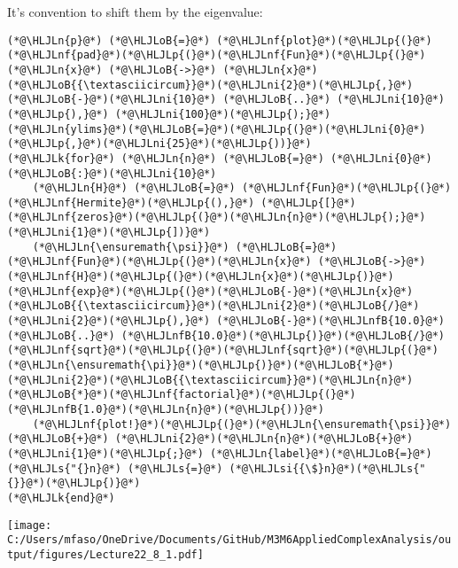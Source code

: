 \documentclass[12pt,landscape]{article}
\newcommand{\HLJLk}[1]{\textcolor[RGB]{148,91,176}{\textbf{#1}}}
\newcommand{\HLJLn}[1]{#1}
\newcommand{\HLJLnf}[1]{\textcolor[RGB]{66,102,213}{#1}}
\newcommand{\HLJLs}[1]{\textcolor[RGB]{201,61,57}{#1}}
\newcommand{\HLJLsi}[1]{#1}
\newcommand{\HLJLnfB}[1]{\textcolor[RGB]{59,151,46}{#1}}
\newcommand{\HLJLni}[1]{\textcolor[RGB]{59,151,46}{#1}}
\newcommand{\HLJLoB}[1]{\textcolor[RGB]{102,102,102}{\textbf{#1}}}
\newcommand{\HLJLp}[1]{#1}
\def\cent#1{\begin{center}#1\end{center} }
\begin{document}
{It's convention to shift them by the eigenvalue:


\begin{lstlisting}
(*@\HLJLn{p}@*) (*@\HLJLoB{=}@*) (*@\HLJLnf{plot}@*)(*@\HLJLp{(}@*)(*@\HLJLnf{pad}@*)(*@\HLJLp{(}@*)(*@\HLJLnf{Fun}@*)(*@\HLJLp{(}@*)(*@\HLJLn{x}@*) (*@\HLJLoB{->}@*) (*@\HLJLn{x}@*)(*@\HLJLoB{{\textasciicircum}}@*)(*@\HLJLni{2}@*)(*@\HLJLp{,}@*) (*@\HLJLoB{-}@*)(*@\HLJLni{10}@*) (*@\HLJLoB{..}@*) (*@\HLJLni{10}@*)(*@\HLJLp{),}@*) (*@\HLJLni{100}@*)(*@\HLJLp{);}@*) (*@\HLJLn{ylims}@*)(*@\HLJLoB{=}@*)(*@\HLJLp{(}@*)(*@\HLJLni{0}@*)(*@\HLJLp{,}@*)(*@\HLJLni{25}@*)(*@\HLJLp{))}@*)
(*@\HLJLk{for}@*) (*@\HLJLn{n}@*) (*@\HLJLoB{=}@*) (*@\HLJLni{0}@*)(*@\HLJLoB{:}@*)(*@\HLJLni{10}@*)
    (*@\HLJLn{H}@*) (*@\HLJLoB{=}@*) (*@\HLJLnf{Fun}@*)(*@\HLJLp{(}@*)(*@\HLJLnf{Hermite}@*)(*@\HLJLp{(),}@*) (*@\HLJLp{[}@*)(*@\HLJLnf{zeros}@*)(*@\HLJLp{(}@*)(*@\HLJLn{n}@*)(*@\HLJLp{);}@*)(*@\HLJLni{1}@*)(*@\HLJLp{])}@*)
    (*@\HLJLn{\ensuremath{\psi}}@*) (*@\HLJLoB{=}@*) (*@\HLJLnf{Fun}@*)(*@\HLJLp{(}@*)(*@\HLJLn{x}@*) (*@\HLJLoB{->}@*) (*@\HLJLnf{H}@*)(*@\HLJLp{(}@*)(*@\HLJLn{x}@*)(*@\HLJLp{)}@*)(*@\HLJLnf{exp}@*)(*@\HLJLp{(}@*)(*@\HLJLoB{-}@*)(*@\HLJLn{x}@*)(*@\HLJLoB{{\textasciicircum}}@*)(*@\HLJLni{2}@*)(*@\HLJLoB{/}@*)(*@\HLJLni{2}@*)(*@\HLJLp{),}@*) (*@\HLJLoB{-}@*)(*@\HLJLnfB{10.0}@*) (*@\HLJLoB{..}@*) (*@\HLJLnfB{10.0}@*)(*@\HLJLp{)}@*)(*@\HLJLoB{/}@*)(*@\HLJLnf{sqrt}@*)(*@\HLJLp{(}@*)(*@\HLJLnf{sqrt}@*)(*@\HLJLp{(}@*)(*@\HLJLn{\ensuremath{\pi}}@*)(*@\HLJLp{)}@*)(*@\HLJLoB{*}@*)(*@\HLJLni{2}@*)(*@\HLJLoB{{\textasciicircum}}@*)(*@\HLJLn{n}@*)(*@\HLJLoB{*}@*)(*@\HLJLnf{factorial}@*)(*@\HLJLp{(}@*)(*@\HLJLnfB{1.0}@*)(*@\HLJLn{n}@*)(*@\HLJLp{))}@*)
    (*@\HLJLnf{plot!}@*)(*@\HLJLp{(}@*)(*@\HLJLn{\ensuremath{\psi}}@*) (*@\HLJLoB{+}@*) (*@\HLJLni{2}@*)(*@\HLJLn{n}@*)(*@\HLJLoB{+}@*)(*@\HLJLni{1}@*)(*@\HLJLp{;}@*) (*@\HLJLn{label}@*)(*@\HLJLoB{=}@*)(*@\HLJLs{"{}n}@*) (*@\HLJLs{=}@*) (*@\HLJLsi{{\$}n}@*)(*@\HLJLs{"{}}@*)(*@\HLJLp{)}@*)
(*@\HLJLk{end}@*)
\end{lstlisting}

\cent{\texttt{[image: C:/Users/mfaso/OneDrive/Documents/GitHub/M3M6AppliedComplexAnalysis/output/figures/Lecture22\_8\_1.pdf]}}

}
\end{document}
